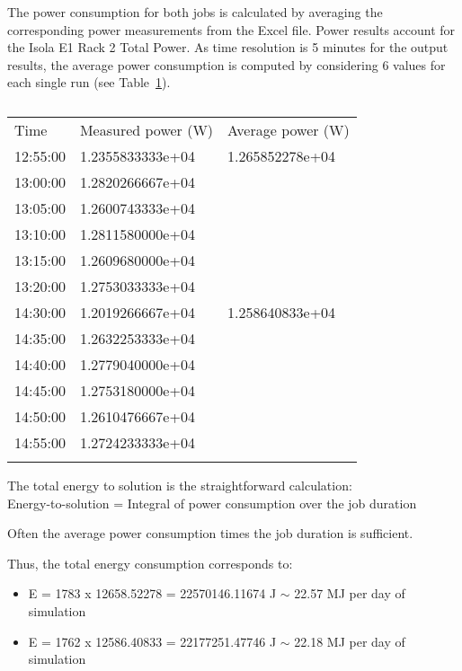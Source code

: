 The power  consumption for  both jobs is  calculated by  averaging the
corresponding power  measurements from the Excel  file.  Power results
account for the  Isola E1 Rack 2 Total Power. As  time resolution is 5
minutes  for the  output  results, the  average  power consumption  is
computed   by  considering  6   values  for   each  single   run  (see
Table~\ref{tab:1}).

\begin{table}
  \begin{center}
    \caption{}
    \label{tab:1}
    \begin{tabular}{lll}
      \hline\noalign{\smallskip}
      Time & Measured power (W) & Average power (W)  \\
      \noalign{\smallskip}\hline\noalign{\smallskip}
      12:55:00 & 1.2355833333e+04 & 1.265852278e+04 \\ 
      13:00:00 & 1.2820266667e+04 &  \\
      13:05:00 & 1.2600743333e+04 &  \\ 
      13:10:00 & 1.2811580000e+04 &  \\
      13:15:00 & 1.2609680000e+04 &  \\
      13:20:00 & 1.2753033333e+04 &  \\
      \noalign{\smallskip}\hline\noalign{\smallskip}
      14:30:00 & 1.2019266667e+04 & 1.258640833e+04 \\ 
      14:35:00 & 1.2632253333e+04 &  \\
      14:40:00 & 1.2779040000e+04 &  \\
      14:45:00 & 1.2753180000e+04 &  \\
      14:50:00 & 1.2610476667e+04 &  \\
      14:55:00 & 1.2724233333e+04 &  \\
      \noalign{\smallskip}\hline
    \end{tabular}
  \end{center}
\end{table}

The  total  energy to  solution  is  the straightforward  calculation:\\  

Energy-to-solution  =  Integral  of  power consumption  over  the  job
duration

Often  the  average  power  consumption  times  the  job  duration  is
sufficient.

Thus, the total energy consumption corresponds to: 
\begin{itemize}
\item E  = 1783 x 12658.52278  = 22570146.11674 J $\sim$  22.57 MJ per
  day of simulation
\item E  = 1762 x 12586.40833  = 22177251.47746 J $\sim$  22.18 MJ per
  day of simulation
\end{itemize}
